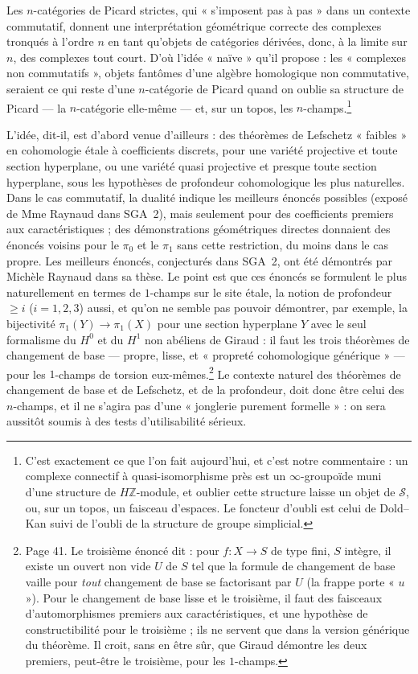 \documentclass[11pt,a4paper]{article}
\begin{document}
Les $n$-catégories de Picard strictes, qui « s'imposent pas à pas » dans un
contexte commutatif, donnent une interprétation géométrique correcte des
complexes tronqués à l'ordre $n$ en tant qu'objets de catégories dérivées,
donc, à la limite sur $n$, des complexes tout court. D'où l'idée « naïve »
qu'il propose : les « complexes non commutatifs », objets fantômes d'une
algèbre homologique non commutative, seraient ce qui reste d'une
$n$-catégorie de Picard quand on oublie sa structure de Picard --- la
$n$-catégorie elle-même --- et, sur un topos, les $n$-champs.\footnote{C'est
exactement ce que l'on fait aujourd'hui, et c'est notre commentaire : un
complexe connectif à quasi-isomorphisme près est un $\infty$-groupoïde
muni d'une structure de $H\mathbb{Z}$-module, et oublier cette structure
laisse un objet de $\mathcal{S}$, ou, sur un topos, un faisceau d'espaces.
Le foncteur d'oubli est celui de Dold--Kan suivi de l'oubli de la
structure de groupe simplicial.}

L'idée, dit-il, est d'abord venue d'ailleurs : des théorèmes de Lefschetz
« faibles » en cohomologie étale à coefficients discrets, pour une variété
projective et toute section hyperplane, ou une variété quasi projective et
presque toute section hyperplane, sous les hypothèses de profondeur
cohomologique les plus naturelles. Dans le cas commutatif, la dualité
indique les meilleurs énoncés possibles (exposé de Mme Raynaud dans SGA~2),
mais seulement pour des coefficients premiers aux caractéristiques ; des
démonstrations géométriques directes donnaient des énoncés voisins pour le
$\pi_0$ et le $\pi_1$ sans cette restriction, du moins dans le cas propre.
Les meilleurs énoncés, conjecturés dans SGA~2, ont été démontrés par
Michèle Raynaud dans sa thèse. Le point est que ces énoncés se formulent le
plus naturellement en termes de $1$-champs sur le site étale, la notion de
profondeur $\geqslant i$ ($i = 1,2,3$) aussi, et qu'on ne semble pas pouvoir
démontrer, par exemple, la bijectivité $\pi_1(Y)\to\pi_1(X)$ pour une section
hyperplane $Y$ avec le seul formalisme du $H^0$ et du $H^1$ non abéliens de
Giraud : il faut les trois théorèmes de changement de base --- propre, lisse,
et « propreté cohomologique générique » --- pour les $1$-champs de torsion
eux-mêmes.\footnote{Page 41. Le troisième énoncé dit : pour $f : X \to S$ de
type fini, $S$ intègre, il existe un ouvert non vide $U$ de $S$ tel que la
formule de changement de base vaille pour \emph{tout} changement de base se
factorisant par $U$ (la frappe porte « $u$ »). Pour le changement de base
lisse et le troisième, il faut des faisceaux d'automorphismes premiers aux
caractéristiques, et une hypothèse de constructibilité pour le troisième ;
ils ne servent que dans la version générique du théorème. Il croit, sans en
être sûr, que Giraud démontre les deux premiers, peut-être le troisième,
pour les $1$-champs.} Le contexte naturel des théorèmes de changement de
base et de Lefschetz, et de la profondeur, doit donc être celui des
$n$-champs, et il ne s'agira pas d'une « jonglerie purement formelle » : on
sera aussitôt soumis à des tests d'utilisabilité sérieux.
\end{document}
